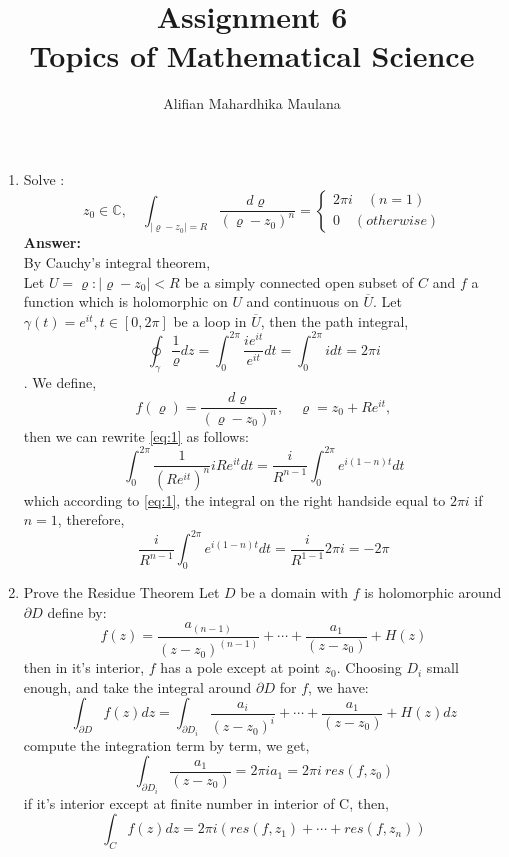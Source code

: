 \documentclass[a4paper,12pt]{article}
\title{Assignment 6\\ Topics of Mathematical Science}
\author{Alifian Mahardhika Maulana}
\newcommand{\C}{\mathbb{C}}
\begin{document}
\maketitle
\begin{enumerate}
	\item Solve :
	\begin{equation}\label{eq:1}
	z_0 \in \C, \quad \int_{|\varrho-z_0|=R} \frac{d\varrho}{(\varrho-z_0)^n} = \begin{cases}
	2\pi i \quad (n=1)\\
	0 \quad (otherwise)
	\end{cases}
	\end{equation}
	\textbf{Answer:}\\
	\newline
	By Cauchy's integral theorem,\\
	Let $U={\varrho:|\varrho-z_0|<R}$ be a simply connected open subset of $C$ and $f$ a function which is holomorphic on $U$ and continuous on $\overline{U}$. Let $\gamma(t)=e^{it}, t \in [0,2\pi]$  be a loop in $\overline{U}$, then the path integral,
	\begin{equation}\label{eq:2}
	\oint_\gamma \frac{1}{\varrho} dz = \int_{0}^{2\pi} \frac{ie^{it}}{e^{it}} dt = \int_{0}^{2\pi} i dt = 2\pi i
	\end{equation}. We define,
	$$f(\varrho) = \frac{d\varrho}{(\varrho-z_0)^n}, \quad \varrho = z_0 + Re^{it},$$ then we can rewrite \eqref{eq:1} as follows:
	\begin{equation}\label{eq:3}
	\int_{0}^{2 \pi} \frac{1}{(Re^{it})^n} iRe^{it} dt = \frac{i}{R^{n-1}} \int_{0}^{2\pi}e^{i(1-n)t} dt
	\end{equation}
	which according to \eqref{eq:1}, the integral on the right handside equal to $2\pi i$ if $n=1$, therefore,
	\begin{equation*}\label{eq:4}
	\frac{i}{R^{n-1}} \int_{0}^{2\pi}e^{i(1-n)t} dt = 	\frac{i}{R^{1-1}} 2\pi i = -2\pi
	\end{equation*}
	\item Prove the Residue Theorem
	\newline
	Let $D$ be a domain with $f$ is holomorphic around $\partial D$ define by:
	$$f(z) = \frac{a_{(n-1)}}{(z-z_0)^{(n-1)}} + \cdots + \frac{a_1}{(z-z_0)} + H(z)$$
	then in it's interior, $f$ has a pole except at point $z_0$. Choosing $D_i$ small enough, and take the integral around $\partial D$ for $f$, we have:
	$$\int_{\partial D} f(z) dz = \int_{\partial D_i} \frac{a_i}{(z-z_0)^i} + \cdots + \frac{a_1}{(z-z_0)} + H(z) dz$$
	compute the integration term by term, we get,
	$$\int_{\partial D_i} \frac{a_1}{(z-z_0)} = 2\pi i a_1 = 2 \pi i\ res(f,z_0)$$
	if it's interior except at finite number in interior of C, then,
	$$\int_C f(z) dz = 2 \pi i (res(f,z_1) + \cdots + res(f,z_n))$$
\end{enumerate}
\end{document}
